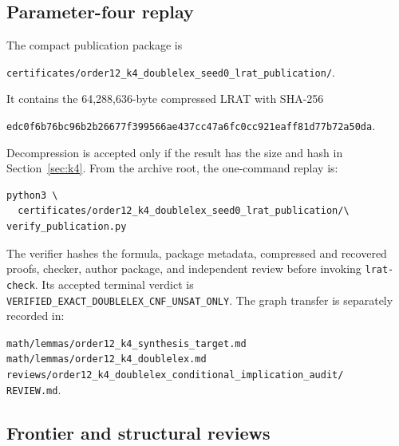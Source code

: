\documentclass[11pt]{article}
\theoremstyle{definition}
\theoremstyle{remark}
\newcommand{\filehash}[1]{\nolinkurl{#1}}
\begin{document}
\subsection{Parameter-four replay}

The compact publication package is
\begin{center}
\texttt{certificates/order12\_k4\_doublelex\_seed0\_lrat\_publication/}.
\end{center}
It contains the 64,288,636-byte compressed LRAT with SHA-256
\begin{center}
\filehash{edc0f6b76bc96b2b26677f399566ae437cc47a6fc0cc921eaff81d77b72a50da}.
\end{center}
Decompression is accepted only if the result has the size and hash in
Section~\ref{sec:k4}.  From the archive root, the one-command replay is:
\begin{verbatim}
python3 \
  certificates/order12_k4_doublelex_seed0_lrat_publication/\
verify_publication.py
\end{verbatim}
The verifier hashes the formula, package metadata, compressed and recovered
proofs, checker, author package, and independent review before invoking
\texttt{lrat-check}.  Its accepted terminal verdict is
\texttt{VERIFIED\_EXACT\_DOUBLELEX\_CNF\_UNSAT\_ONLY}.  The graph transfer
is separately recorded in:
\begin{center}
\begin{minipage}{0.95\linewidth}
\texttt{math/lemmas/order12\_k4\_synthesis\_target.md}\\
\texttt{math/lemmas/order12\_k4\_doublelex.md}\\
\texttt{reviews/order12\_k4\_doublelex\_conditional\_implication\_audit/}\\
\hspace*{1em}\texttt{REVIEW.md}.
\end{minipage}
\end{center}

\subsection{Frontier and structural reviews}
\end{document}
